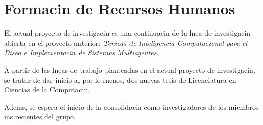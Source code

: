 \documentclass[a4paper,12pt,twocolumn]{article}
\begin{document}
\section{Formacin de Recursos Humanos}
\label{sec:form-de-recurs}

El actual proyecto de investigacin es una continuacin de la lnea de investigacin abierta en el  proyecto anterior: 
 \emph{Tcnicas de Inteligencia Computacional para el Diseo e Implementacin de Sistemas Multiagentes}. 

A partir de las lneas de trabajo planteadas en el actual proyecto de investigacin, se tratar de dar inicio a, por lo menos, dos nuevas tesis de Licenciatura en Ciencias de la Computacin.

Adems, se espera el inicio de la consolidacin como investigadores de los miembros ms recientes del grupo.



\end{document}
